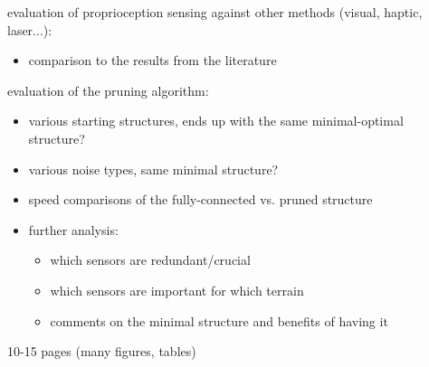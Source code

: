 evaluation of proprioception sensing against other methods (visual, haptic, laser...):
\begin{itemize}
\item comparison to the results from the literature
\end{itemize}

evaluation of the pruning algorithm:
\begin{itemize}
\item various starting structures, ends up with the same minimal-optimal structure?
\item various noise types, same minimal structure?
\item speed comparisons of the fully-connected vs. pruned structure
\item further analysis:
 \begin{itemize}
 \item which sensors are redundant/crucial
 \item which sensors are important for which terrain
 \item comments on the minimal structure and benefits of having it
 \end{itemize}
\end{itemize}
10-15 pages (many figures, tables)
